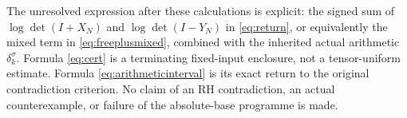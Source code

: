 The unresolved expression after these calculations is explicit: the signed sum of $\log\det(I+X_N)$ and $\log\det(I-Y_N)$ in \eqref{eq:return}, or equivalently the mixed term in \eqref{eq:freeplusmixed}, combined with the inherited actual arithmetic $\delta_k^\sigma$. Formula \eqref{eq:cert} is a terminating fixed-input enclosure, not a tensor-uniform estimate. Formula \eqref{eq:arithmeticinterval} is its exact return to the original contradiction criterion. No claim of an RH contradiction, an actual counterexample, or failure of the absolute-base programme is made.